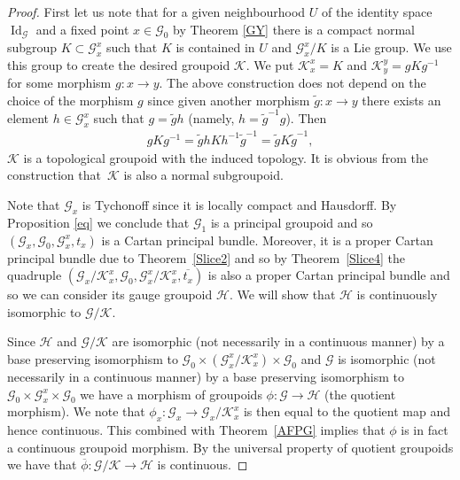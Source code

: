 \documentclass[pdftex]{sigma}
\begin{document}
\begin{proof} First let us note that for a given neighbourhood $U$ of the identity space $\operatorname{Id}_{\mathcal{G}}$ and a fixed point $x\in\mathcal{G}_0$ by Theorem \ref{GY} there is a compact normal subgroup $K\subset\mathcal{G}^x_x$ such that $K$ is contained in $U$ and $\mathcal{G}^x_x\slash K$ is a Lie group. We use this group to create the desired groupoid $\mathcal{K}$. We put $\mathcal{K}^x_x=K$ and $\mathcal{K}^y_y=gKg^{-1}$ for some morphism $g\colon x\rightarrow y$. The above construction does not depend on the choice of the morphism $g$ since given another morphism $\tilde{g}\colon x\rightarrow y$ there exists an element $h\in\mathcal{G}^x_x$ such that $g=\tilde{g}h$ (namely, $h=\tilde{g}^{-1}g$). Then
\begin{gather*}
gKg^{-1}=\tilde{g}hKh^{-1}\tilde{g}^{-1}=\tilde{g}K\tilde{g}^{-1},
\end{gather*}
$\mathcal{K}$ is a topological groupoid with the induced topology. It is obvious from the construction that~$\mathcal{K}$ is also a normal subgroupoid.

Note that $\mathcal{G}_x$ is Tychonoff since it is locally compact and Hausdorff. By Proposition \ref{eq} we conclude that $\mathcal{G}_1$ is a principal groupoid and so $(\mathcal{G}_x,\mathcal{G}_0,\mathcal{G}^x_x,t_x)$ is a Cartan principal bundle. Moreover, it is a proper Cartan principal bundle due to Theorem~\ref{Slice2} and so by Theorem~\ref{Slice4} the quadruple $(\mathcal{G}_x\slash\mathcal{K}^x_x,\mathcal{G}_0,\mathcal{G}^x_x\slash\mathcal{K}^x_x,\overline{t_x})$ is also a proper Cartan principal bundle and so we can consider its gauge groupoid $\mathcal{H}$. We will show that $\mathcal{H}$ is continuously isomorphic to $\mathcal{G}\slash\mathcal{K}$.

Since $\mathcal{H}$ and $\mathcal{G}\slash\mathcal{K}$ are isomorphic (not necessarily in a continuous manner) by a base preserving isomorphism to $\mathcal{G}_0\times(\mathcal{G}^x_x\slash\mathcal{K}^x_x)\times\mathcal{G}_0$ and $\mathcal{G}$ is isomorphic (not necessarily in a continuous manner) by a base preserving isomorphism to $\mathcal{G}_0\times\mathcal{G}^x_x\times\mathcal{G}_0$ we have a morphism of groupoids $\phi\colon \mathcal{G}\rightarrow\mathcal{H}$ (the quotient morphism). We note that $\phi_x\colon \mathcal{G}_x\rightarrow\mathcal{G}_x\slash\mathcal{K}^x_x$ is then equal to the quotient map and hence continuous. This combined with Theorem~\ref{AFPG} implies that $\phi$ is in fact a continuous groupoid morphism. By the universal property of quotient groupoids we have that $\overline{\phi}\colon \mathcal{G}\slash\mathcal{K}\rightarrow\mathcal{H}$ is continuous.


\end{proof}
\end{document}
